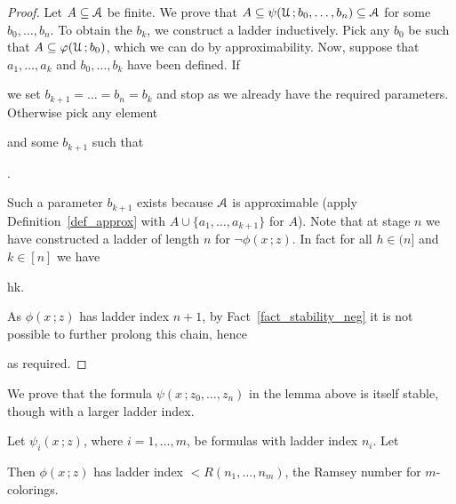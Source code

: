 \documentclass[scombinatorics.tex]{subfiles}
\begin{document}
\begin{proof}
  Let $A\subseteq\EuScript A$ be finite.
  We prove that $A\subseteq\psi(\EuScript U\,;b_0,\dots,b_n)\subseteq\EuScript A$ for some $b_0,\dots,b_n$.
  To obtain the $b_k$, we construct a ladder inductively.
  Pick any $b_0$ be such that $A\subseteq\varphi(\EuScript U\,;b_0)$, which we can do by approximability.
  Now, suppose that $a_1,\dots,a_k$ and $b_0,\dots,b_k$ have been defined.
  If 


  we set $b_{k+1}=\dots=b_n=b_k$ and stop as we already have the required parameters.
  Otherwise pick any element


  and some $b_{k+1}$ such that

  .

  Such a parameter $b_{k+1}$ exists because $\EuScript A$ is approximable (apply Definition~\ref{def_approx} with $A\cup\{a_1,\dots,a_{k+1}\}$ for $A$).
  Note that at stage $n$ we have constructed a ladder of length $n$ for $\neg\phi(x\,;z)$.
  In fact for all $h\in(n]$ and $k\in[n]$ we have
  
  {\IFF}
  {h\le k.}
  
  As $\phi(x\,;z)$ has ladder index $n+1$, by Fact~\ref{fact_stability_neg} it is not possible to further prolong this chain, hence


  as required.
\end{proof}

We prove that the formula $\psi(x\,;z_0,\dots,z_n)$ in the lemma above is itself stable, though with a larger ladder index.
  
\begin{lemma}
  Let $\psi_i(x\,;z)$, where $i=1,\dots,m$, be formulas with ladder index $n_i$. Let
  
  
  Then $\phi(x\,;z)$ has ladder index $<R(n_1,\dots, n_m)$, the Ramsey number for $m$-colorings.
\end{lemma}
  
\end{document}
